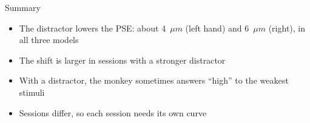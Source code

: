\begin{frame}{Summary}
  \begin{itemize}
    \setlength{\itemsep}{0.8em}
    \item The distractor lowers the PSE: about 4~$\mu m$ (left hand) and 6~$\mu m$ (right),
          in all three models
    \item The shift is larger in sessions with a stronger distractor
    \item With a distractor, the monkey sometimes answers ``high'' to the weakest stimuli
    \item Sessions differ, so each session needs its own curve
  \end{itemize}
\end{frame}
